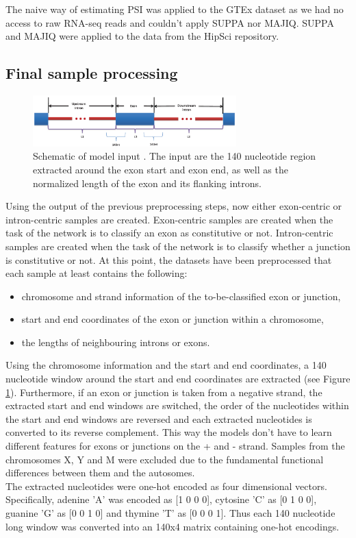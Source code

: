 The naive way of estimating PSI was applied to the GTEx dataset as we had no access to raw RNA-seq reads and couldn't apply SUPPA nor MAJIQ. SUPPA and MAJIQ were applied to the data from the HipSci repository.
\subsection{Final sample processing} \label{subsec:finalsampleprocessing}

\begin{figure}
	\centering\includegraphics[width=0.7\textwidth]{../visualizations/ch4-methods/input_schematic.png} 
	\caption[bla.]{Schematic of model input \cite{dsc}. The input are the 140 nucleotide region extracted around the exon start and exon end, as well as the normalized length of the exon and its flanking introns. }
	\label{fig:inputschematic}
\end{figure}

Using the output of the previous preprocessing steps, now either exon-centric or intron-centric samples are created. Exon-centric samples are created when the task of the network is to classify an exon as constitutive or not. Intron-centric samples are created when the task of the network is to classify whether a junction is constitutive or not.
At this point, the datasets have been preprocessed that each sample at least contains the following:

\begin{itemize}
	\item chromosome and strand information of the to-be-classified exon or junction,
	\item start and end coordinates of the exon or junction within a chromosome,
	\item the lengths of neighbouring introns or exons.
\end{itemize}

Using the chromosome information and the start and end coordinates, a 140 nucleotide window around the start and end coordinates are extracted (see Figure \ref{fig:inputschematic}). Furthermore, if an exon or junction is taken from a negative strand, the extracted start and end windows are switched, the order of the nucleotides within the start and end windows are reversed and each extracted nucleotides is converted to its reverse complement. This way the models don't have to learn different features for exons or junctions on the + and - strand.
Samples from the chromosomes X, Y and M were excluded due to the fundamental functional differences between them and the autosomes. \\
The extracted nucleotides were one-hot encoded as four dimensional vectors. Specifically, adenine 'A' was encoded as [1 0 0 0], cytosine 'C' as [0 1 0 0], guanine 'G' as [0 0 1 0] and thymine 'T' as [0 0 0 1]. Thus each 140 nucleotide long window was converted into an 140x4 matrix containing one-hot encodings.

